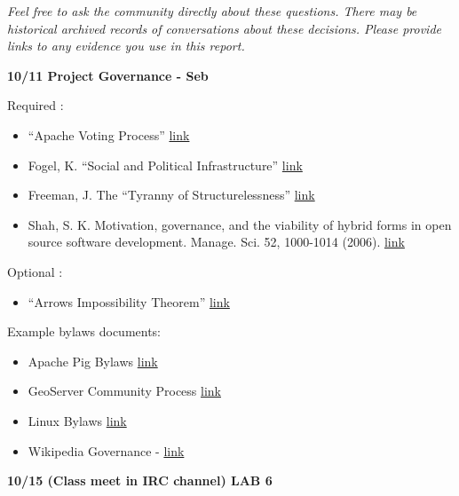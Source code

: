 \emph{Feel free to ask the community directly about these questions.
There may be historical archived records of conversations about these
decisions. Please provide links to any evidence you use in this report.}

\textbf{10/11 Project Governance - Seb}

Required :

\begin{itemize}
\itemsep1pt\parskip0pt
\item
  ``Apache Voting Process''
  \href{http://www.apache.org/foundation/voting.html}{link}
\item
  Fogel, K. ``Social and Political Infrastructure''
  \href{http://producingoss.com/en/social-infrastructure.html}{link}
\item
  Freeman, J. The ``Tyranny of Structurelessness''
  \href{http://www.jofreeman.com/joreen/tyranny.htm}{link}
\item
  Shah, S. K. Motivation, governance, and the viability of hybrid forms
  in open source software development. Manage. Sci. 52, 1000-1014
  (2006).
  \href{http://faculty.washington.edu/skshah/Shah\%20-\%20Motivation,\%20Governance,\%20Hybrid\%20Forms.pdf}{link}
\end{itemize}

Optional :

\begin{itemize}
\itemsep1pt\parskip0pt
\item
  ``Arrows Impossibility Theorem''
  \href{http://en.wikipedia.org/wiki/Arrow\%27s_impossibility_theorem}{link}
\end{itemize}

Example bylaws documents:

\begin{itemize}
\itemsep1pt\parskip0pt
\item
  Apache Pig Bylaws
  \href{http://www.apache.org/foundation/voting.html}{link}
\item
  GeoServer Community Process
  \href{http://docs.geoserver.org/stable/en/developer/policies/community-process.html}{link}
\item
  Linux Bylaws \href{http://www.linuxfoundation.org/about/bylaws}{link}
\item
  Wikipedia Governance -
  \href{http://p2pfoundation.net/Wikipedia_-_Governance}{link}
\end{itemize}

\textbf{10/15 (Class meet in IRC channel) LAB 6}

